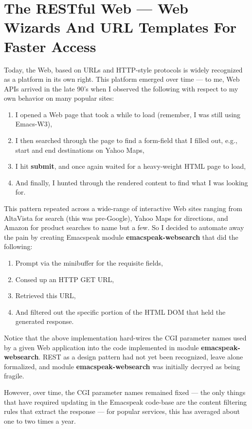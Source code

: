 \documentclass[11pt]{article}
\begin{document}
\section{The RESTful Web —  Web Wizards And URL Templates For Faster Access}
\label{sec:orgf3bf453}

Today, the Web, based on URLs and HTTP-style protocols is widely
recognized as a platform in its own right. This platform emerged
over time — to me, Web APIs arrived in the late 90's when I
observed the following with respect to my own behavior on many
popular sites:

\begin{enumerate}
\item I opened a Web page that took a while to load (remember,  I
was still using Emacs-W3),
\item I then searched through the page to find a form-field that
I filled out, e.g., start and end destinations on Yahoo
Maps,
\item I hit \textbf{submit}, and once again waited for a heavy-weight
HTML page to load,
\item And finally, I hunted through the rendered content to find
what I was looking for.
\end{enumerate}

This pattern repeated across a wide-range of interactive Web
sites ranging from AltaVista for search (this was pre-Google),
Yahoo Maps for directions, and Amazon for product searches to
name but a few. So I decided to automate away the pain by
creating Emacspeak module \textbf{emacspeak-websearch} that did the
following:

\begin{enumerate}
\item Prompt via the minibuffer for the requisite fields,
\item Consed up an HTTP GET URL,
\item Retrieved this URL,
\item And filtered out the specific portion of the HTML  DOM that
held the generated response.
\end{enumerate}

Notice that the above implementation hard-wires the CGI parameter
names used by a given Web application into the code implemented
in module \textbf{emacspeak-websearch}. REST as a design pattern had not
yet been recognized, leave alone formalized, and module
\textbf{emacspeak-websearch} was initially decryed as being fragile.

However, over time, the CGI parameter names remained fixed — the
 only things that have required updating in the Emacspeak
 code-base are the content filtering rules that extract the
 response — for popular services, this has averaged about one to
 two times a year.
\end{document}
